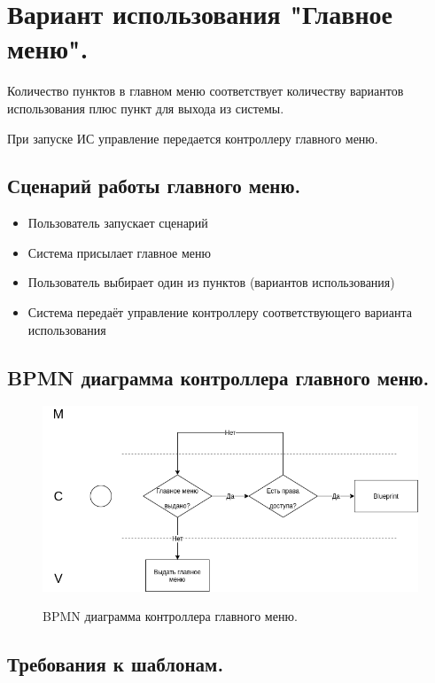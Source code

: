 \documentclass[12pt, a4paper]{article}
\begin{document}
   \section{Вариант использования "Главное меню".}
   
   Количество пунктов в главном меню соответствует количеству вариантов использования
   плюс пункт для выхода из системы.
   
   При запуске ИС управление передается контроллеру главного меню.
   
   \subsection{Сценарий работы главного меню.}
   \begin{itemize}
   	\item Пользователь запускает сценарий
   	\item Система присылает главное меню
   	\item Пользователь выбирает один из пунктов (вариантов использования)
   	\item Система передаёт управление контроллеру соответствующего варианта
   	использования
   \end{itemize}
   \newpage

   \subsection{BPMN диаграмма контроллера главного меню.}
   \begin{figure}[h]
   	\centering    %
   	\includegraphics[width=1\textwidth]{pictures/BPMN_main_menu_using.png}
   	\label{fig:pic2} %
   	\caption{BPMN диаграмма контроллера главного меню.}
   \end{figure}

   \subsection{Требования к шаблонам.}
   
\end{document}
